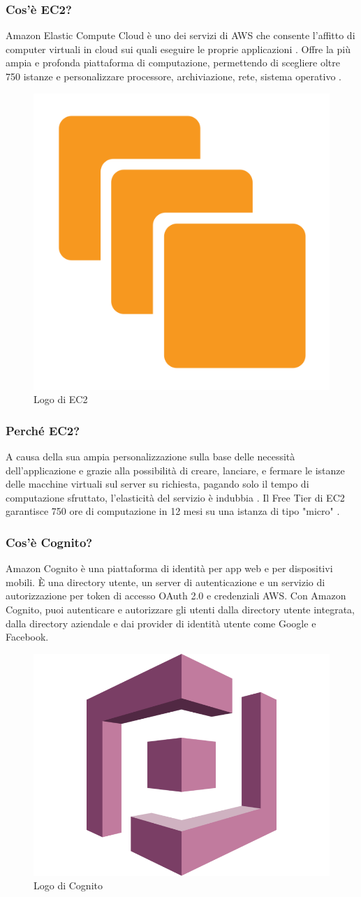             \subsubsection{Cos'è EC2?}
                Amazon Elastic Compute Cloud è uno dei servizi di AWS che consente l'affitto di computer virtuali in cloud sui quali eseguire le proprie applicazioni \cite{Wikipedia6}. Offre la più ampia e profonda piattaforma di computazione, permettendo di scegliere oltre 750 istanze e personalizzare processore, archiviazione, rete, sistema operativo \cite{AWS2}.
            \begin{figure}[htbp!]
                \centering
                \includegraphics[width=0.2\linewidth]{Immagini/System Design/AWS EC2.png}
                \caption{Logo di EC2}
            \end{figure}
            \subsubsection{Perché EC2?}
                A causa della sua ampia personalizzazione sulla base delle necessità dell'applicazione e grazie alla possibilità di creare, lanciare, e fermare le istanze delle macchine virtuali sul server su richiesta, pagando solo il tempo di computazione sfruttato, l'elasticità del servizio è indubbia \cite{Wikipedia6}. Il Free Tier di EC2 garantisce 750 ore di computazione in 12 mesi su una istanza di tipo "micro" \cite{AWS3}.
            \subsubsection{Cos'è Cognito? \cite{AWS4}} 
                Amazon Cognito è una piattaforma di identità per app web e per dispositivi mobili. È una directory utente, un server di autenticazione e un servizio di autorizzazione per token di accesso OAuth 2.0 e credenziali AWS. Con Amazon Cognito, puoi autenticare e autorizzare gli utenti dalla directory utente integrata, dalla directory aziendale e dai provider di identità utente come Google e Facebook.
            \begin{figure}[htbp!]
                \centering
                \includegraphics[width=0.2\linewidth]{Immagini/System Design/AWS Cognito.png}
                \caption{Logo di Cognito}
            \end{figure}
